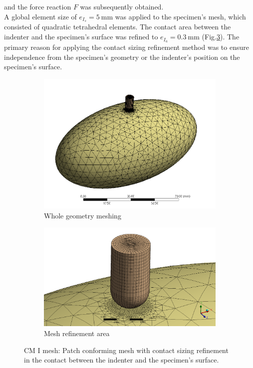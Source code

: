 and the force reaction $F$ was subsequently obtained.\\
A global element size of $e_{I_s}=\SI{5}{\milli\meter}$ was applied to the specimen's mesh, which 
consisted of quadratic tetrahedral elements. The contact area between the indenter and the specimen's surface 
was refined to $e_{I_a}=\SI{0.3}{\milli\meter}$ (Fig.\ref{fig:cpImesh}). The primary reason for applying the contact
sizing refinement method was to ensure independence from the specimen's geometry or the indenter's position on the specimen's surface.\\
\begin{figure}
    \centering
    \begin{subfigure}[b]{0.45\textwidth}
    \centering
    \includegraphics[width=\textwidth]{Images/computational/MeshCSES03total.png}
    \caption{Whole geometry meshing}
    \label{fig:cp1meshtotal}
    \end{subfigure}
    \hfill
    \begin{subfigure}[b]{0.45\textwidth}
    \centering
    \includegraphics[width=\textwidth]{Images/computational/MeshCSES03.png}
    \caption{Mesh refinement area}
    \label{fig:cp1meshref}
    \end{subfigure}
    \hspace{0.3cm}
    \caption[Computational model I mesh]{CM I mesh: Patch conforming mesh with contact sizing refinement in the contact between the indenter and the specimen's surface.}
    \label{fig:cpImesh}
\end{figure}

